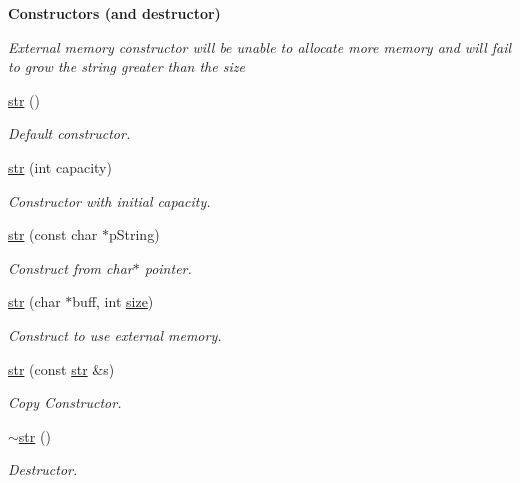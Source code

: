\begin{Indent}{\bf Constructors (and destructor)}\par
{\em External memory constructor will be unable to allocate more memory and will fail to grow the string greater than the size }\begin{DoxyCompactItemize}
\item 
\hyperlink{classstr_a48b4d5a786a4b82767baefdeff09723a}{str} ()
\begin{DoxyCompactList}\small\item\em Default constructor. \end{DoxyCompactList}\item 
\hyperlink{classstr_a3e4992b25c2be2ed5f6fb8fa28c96a9a}{str} (int capacity)
\begin{DoxyCompactList}\small\item\em Constructor with initial capacity. \end{DoxyCompactList}\item 
\hyperlink{classstr_a5c9d2ff8ffea93ac4ae9abad9e994575}{str} (const char $\ast$p\+String)
\begin{DoxyCompactList}\small\item\em Construct from char$\ast$ pointer. \end{DoxyCompactList}\item 
\hyperlink{classstr_a5933ae5984cd111ad5d3d70595fa9602}{str} (char $\ast$buff, int \hyperlink{trace_2readme_8txt_a5b63272b2fdc1bee3a5c822dfc08d754}{size})
\begin{DoxyCompactList}\small\item\em Construct to use external memory. \end{DoxyCompactList}\item 
\hyperlink{classstr_a51a0f3dc96c628e4ae48a78569a47706}{str} (const \hyperlink{classstr}{str} \&s)
\begin{DoxyCompactList}\small\item\em Copy Constructor. \end{DoxyCompactList}\item 
\hyperlink{classstr_ab39a45bef59383ad406b1faae81a73e1}{$\sim$str} ()
\begin{DoxyCompactList}\small\item\em Destructor. \end{DoxyCompactList}\end{DoxyCompactItemize}
\end{Indent}
